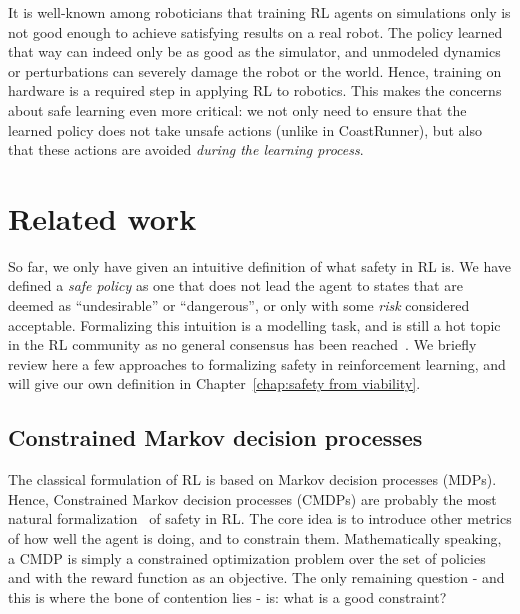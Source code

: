 	It is well-known among roboticians that training RL agents on simulations only is not good enough to achieve satisfying results on a real robot. The policy learned that way can indeed only be as good as the simulator, and unmodeled dynamics or perturbations can severely damage the robot or the world. Hence, training on hardware is a required step in applying RL to robotics. This makes the concerns about safe learning even more critical: we not only need to ensure that the learned policy does not take unsafe actions (unlike in CoastRunner), but also that these actions are avoided \emph{during the learning process}.
	
\section{Related work}
	So far, we only have given an intuitive definition of what safety in RL is. We have defined a\emph{ safe policy} as one that does not lead the agent to states that are deemed as \enquote{undesirable} or \enquote{dangerous}, or only with some\emph{ risk} considered acceptable. Formalizing this intuition is a modelling task, and is still a hot topic in the RL community as no general consensus has been reached~\cite{garcia2015comprehensive}. We briefly review here a few approaches to formalizing safety in reinforcement learning, and will give our own definition in Chapter~\ref{chap:safety from viability}.
	
	\subsection{Constrained Markov decision processes} \label{subsec:CMDPs related work}
		The classical formulation of RL is based on Markov decision processes (MDPs). Hence, Constrained Markov decision processes (CMDPs) are probably the most natural formalization~\cite{garcia2015comprehensive} of safety in RL. The core idea is to introduce other metrics of how well the agent is doing, and to constrain them. Mathematically speaking, a CMDP is simply a constrained optimization problem over the set of policies and with the reward function as an objective. The only remaining question - and this is where the bone of contention lies - is: what is a good constraint? 
		
